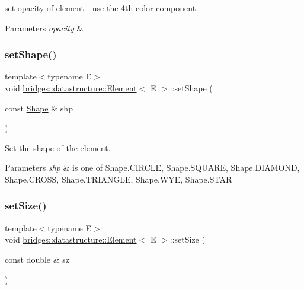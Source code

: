set opacity of element -\/ use the 4th color component


\begin{DoxyParams}{Parameters}
{\em opacity} & \\
\hline
\end{DoxyParams}
\mbox{\label{classbridges_1_1datastructure_1_1_element_a1ef398bf1027244a624575e58a569ed9}} 
\subsubsection{\texorpdfstring{set\+Shape()}{setShape()}}
{\footnotesize\ttfamily template$<$typename E$>$ \\
void \hyperlink{classbridges_1_1datastructure_1_1_element}{bridges\+::datastructure\+::\+Element}$<$ E $>$\+::set\+Shape (\begin{DoxyParamCaption}\item[{const \hyperlink{namespacebridges_1_1datastructure_a3408f5f44d9c6062e5f3adb7e1bbb7f0}{Shape} \&}]{shp }\end{DoxyParamCaption})\hspace{0.3cm}{\ttfamily [inline]}}



Set the shape of the element. 


\begin{DoxyParams}{Parameters}
{\em shp} & is one of Shape.\+C\+I\+R\+C\+LE, Shape.\+S\+Q\+U\+A\+RE, Shape.\+D\+I\+A\+M\+O\+ND, Shape.\+C\+R\+O\+SS, Shape.\+T\+R\+I\+A\+N\+G\+LE, Shape.\+W\+YE, Shape.\+S\+T\+AR \\
\hline
\end{DoxyParams}
\mbox{\label{classbridges_1_1datastructure_1_1_element_a3200b0ac712c1720db62d1f0bbcb14be}} 
\subsubsection{\texorpdfstring{set\+Size()}{setSize()}}
{\footnotesize\ttfamily template$<$typename E$>$ \\
void \hyperlink{classbridges_1_1datastructure_1_1_element}{bridges\+::datastructure\+::\+Element}$<$ E $>$\+::set\+Size (\begin{DoxyParamCaption}\item[{const double \&}]{sz }\end{DoxyParamCaption})\hspace{0.3cm}{\ttfamily [inline]}}




